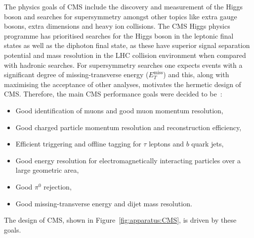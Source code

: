 The physics goals of CMS include the discovery and measurement of the Higgs boson and searches for supersymmetry amongst other topics like extra gauge bosons, extra dimensions and heavy ion collisions. 
The CMS Higgs physics programme has prioritised searches for the Higgs boson in the leptonic final states as well as the diphoton final state, as these have superior signal separation potential and mass resolution in the LHC collision environment when compared with hadronic searches. For supersymmetry searches one expects events with a significant degree of missing-transverse energy ($E_{T}^{\mathrm{miss}}$) and this, along with maximising the acceptance of other analyses, motivates the hermetic design of CMS. Therefore, the main CMS performance goals were decided to be~\cite{CMSatLHC}:
\begin{itemize}[noitemsep]%
    \item Good identification of muons and good muon momentum resolution,
    \item Good charged particle momentum resolution and reconstruction efficiency,
    \item Efficient triggering and offline tagging for $\tau$ leptons and $b$ quark jets, 
    \item Good energy resolution for electromagnetically interacting particles over a large geometric area,  
    \item Good $\pi^{0}$ rejection,
    \item Good missing-transverse energy and dijet mass resolution.
\end{itemize}
The design of CMS, shown in Figure~\ref{fig:apparatus:CMS}, is driven by these goals. 

